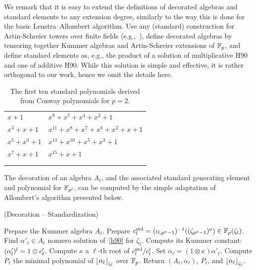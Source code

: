 \documentclass[sigconf]{acmart}
\begin{document}
We remark that it is easy to extend the definitions of decorated
algebras and standard elements to any extension degree, similarly to
the way this is done for the basic Lenstra--Allombert algorithm. %
Use any (standard) construction for Artin-Schreier towers over finite
fields (e.g.,~\cite{df+schost12}), define decorated algebras by
tensoring together Kummer algebras and Artin-Schreier extensions of
$\mathbb{F}_p$, and define standard elements as, e.g., the product of a
solution of multiplicative H90 and one of additive H90. %
While this solution is simple and effective, it is rather orthogonal
to our work, hence we omit the details here.

\begin{table}[b]
  \centering
  \small
  \begin{tabularx}{\columnwidth}{>{\raggedleft\arraybackslash}X | >{\raggedleft\arraybackslash}X}
    $x+1$ & $x^9+x^7+x^4+x^2+1$\\
    $x^3+x+1$ & $x^{11}+x^8+x^7+x^6+x^2+x+1$\\
    $x^5+x^3+1$ & $x^{13}+x^{10}+x^5+x^3+1$\\
    $x^7+x+1$ & $x^{15}+x+1$ \\[0.3em]
    \multicolumn{2}{r}{$x^{17}+x^{11}+x^{10}+x^8+ x^7+x^6+x^4+x^3+x^2+x+1$} \\
    \multicolumn{2}{r}{$x^{19}+x^{17}+x^{16}+x^{15}+x^{14}+x^{13}+x^{12}+x^8+x^7+x^6+x^5+x^3+1$}
  \end{tabularx}
  
  \caption{The first ten standard polynomials derived from Conway
    polynomials for $p=2$.}
  \label{tab:std-polys}
\end{table}


The decoration of an algebra $A_\ell$, and the associated standard
generating element and polynomial for $\mathbb{F}_{p^l}$, can be computed by the simple adaptation of
Allombert's algorithm presented below. %

\begin{algorithm}
  \caption{(Decoration -- Standardization)}
  \label{algo:decoration}
  \begin{algorithmic}[1]
  \STATE Prepare the Kummer algebra $A_\ell$.
  \STATE Prepare $c^{\mathrm{std}}_l=({\iota_{{l},{p^a-1}}})^{-1}((\zeta_{p^a-1})^a)\in\mathbb{F}_p(\zeta_l)$.
  \STATE Find $\alpha'_\ell\in A_\ell$ nonzero solution of~\eqref{h90} for $\zeta_\ell$.
  \STATE Compute its Kummer constant: $(\alpha'_l)^l=1\otimes c'_l$.
  \STATE Compute $\kappa$ a $\ell$-th root of $c^{\mathrm{std}}_l/c'_l$.
  \STATE Set $\alpha_{\ell}=(1\otimes\kappa)\alpha'_\ell$.
  \STATE Compute $P_\ell$ the minimal polynomial of $\left\lfloor \alpha_{l} \right\rfloor_{\zeta_l}$ over $\mathbb{F}_{p}$.
  \STATE Return $(A_\ell,\alpha_\ell)$, $P_\ell$, and $\left\lfloor \alpha_l \right\rfloor_{\zeta_l}$.
  \end{algorithmic}
\end{algorithm}
\end{document}
